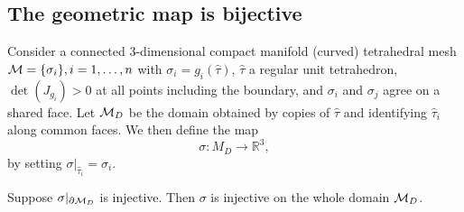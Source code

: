 \subsection{The geometric map is bijective}\label{cumin:sec:bij-proof}

Consider a connected 3-dimensional compact manifold {(curved)} tetrahedral mesh $\mathcal{M} = \{\sigma_i \}, i=1,\dots,n$ with
$\sigma_i = g_i(\hat \tau)$, $\hat \tau$ a regular unit tetrahedron, $\det(J_{g_i}) > 0$ at all points including the boundary, and $\sigma_i$ and $\sigma_j$ agree on a shared face. 
%
Let $\mathcal{M}_D$ be the domain obtained by copies of  $\hat \tau$ and identifying $\hat \tau_i$ along common faces. We then define the map 
\[
\sigma\colon M_D \to \mathbb{R}^3,
\]
by setting $\sigma|_{\hat \tau_i} = \sigma_i$.

\begin{proposition}
Suppose $\sigma|_{\partial\mathcal{M}_D}$ is injective. Then $\sigma$ is injective on the whole domain $\mathcal{M}_D$. 
\end{proposition}
